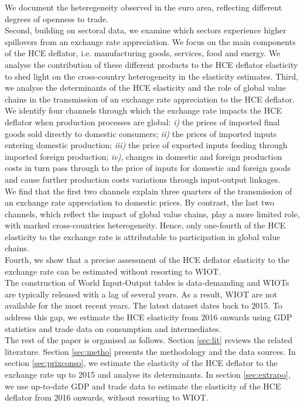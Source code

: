 \documentclass[12pt,a4paper]{paper}
\begin{document}
We document the heteregeneity observed in the euro area, reflecting different degrees of openness to trade. \\
Second, building on sectoral data, we examine which sectors experience higher spillovers from an exchange rate appreciation. 
We focus on the main components of the HCE deflator, i.e. manufacturing goods, services, food and energy. 
We analyse the contribution of these different products to the HCE deflator elasticity to shed light on the cross-country heterogeneity in the elasticity estimates.
Third, we analyse the determinants of the HCE elasticity and the role of global value chains in the transmission of an exchange rate appreciation to the HCE deflator. 
We identify four channels through which the exchange rate impacts the HCE deflator when production processes are global: \textit{i)} the prices of imported ﬁnal goods sold directly to domestic consumers;
\textit{ii)} the prices of imported inputs entering domestic production; 
\textit{iii)} the price of exported inputs feeding through imported foreign production;
\textit{iv)}, changes in domestic and foreign production costs in turn pass through to the price of inputs for domestic and foreign goods and cause further production costs variations through input-output linkages.\\
We find that the first two channels explain three quarters of the transmission of an exchange rate appreciation to domestic prices.
By contrast, the last two channels, which reflect the impact of global value chains, play a more limited role, with marked cross-countries heterogeneity.
Hence, only one-fourth of the HCE elasticity to the exchange rate is attributable to participation in global value chains.\\
Fourth, we show that a precise assessment of the HCE deflator elasticity to the exchange rate can be estimated without resorting to WIOT. \\
The construction of World Input-Output tables is data-demanding and WIOTs are typically released with a lag of several years.
As a result, WIOT are not available for the most recent years. The latest dataset dates back to 2015. 
To address this gap, we estimate the HCE elasticity from 2016 onwards using GDP statistics and trade data on consumption and intermediates.\\
The rest of the paper is organised as follows.
Section \ref{sec:lit} reviews the related literature.
Section \ref{sec:metho} presents the methodology and the data sources.
In section \ref{sec:prixconso}, we estimate the elasticity of the HCE deflator to the exchange rate up to 2015 and analyse its determinants.
In section \ref{sec:extrapo}, we use up-to-date GDP and trade data to estimate the elasticity of the HCE deflator from 2016 onwards, without resorting to WIOT.
\end{document}
